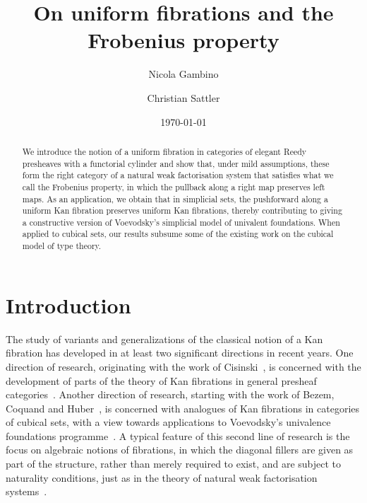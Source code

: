 \documentclass[reqno,10pt,a4paper,oneside]{amsart}
\title[Uniform fibrations]{On uniform fibrations and
the Frobenius property}
\begin{document}
\begin{abstract}
We introduce the notion of a uniform fibration in categories of elegant Reedy presheaves
with a functorial cylinder 
and show that, under mild assumptions, these form the right category of a natural weak
factorisation system that satisfies what we call the Frobenius property, \ie in which the
pullback along a right map preserves left maps. As an application, we obtain that in
simplicial sets,  the pushforward along a uniform Kan
fibration preserves uniform Kan fibrations, thereby contributing to giving a constructive
version of Voevodsky's simplicial model of univalent foundations. When applied
to cubical sets, our results  subsume some of the existing work on the cubical
model of type theory.
\end{abstract}

\author{Nicola Gambino}
\address{School of Mathematics, University of Leeds, Leeds LS2 9JT, UK}

\author{Christian Sattler}
\address{School of Mathematics, University of Leeds, Leeds LS2 9JT, UK}

\date{\today}

\maketitle



\section*{Introduction}

The study of variants and generalizations of the classical notion of a Kan fibration has developed
in at least two significant directions in recent years. One direction of research, originating with the work of
Cisinski~\cite{cisinski-asterisque}, is concerned with the development of  parts of the theory of Kan fibrations in
general presheaf categories~\cite{cisinski-univalence,moerdijk-minimal}.  Another direction of
research, starting with the work of Bezem, Coquand and Huber~\cite{coquand-cubical-sets},
 is concerned with 
analogues of Kan fibrations in categories of cubical sets,
with a view towards applications to Voevodsky's univalence foundations programme~\cite{awodey-cubical,coquand-cubical-sets,coquand-variation,huber-thesis,pitts-cubical-nominal,swan-awfs}. A typical feature of this second line of research is  the focus on algebraic notions of fibrations, in which the diagonal fillers are given as part of the structure, rather than merely required to
exist, and are subject to naturality conditions, just as 
in the theory of natural weak factorisation 
systems~\cite{grandis-tholen-nwfs}.
\end{document}
